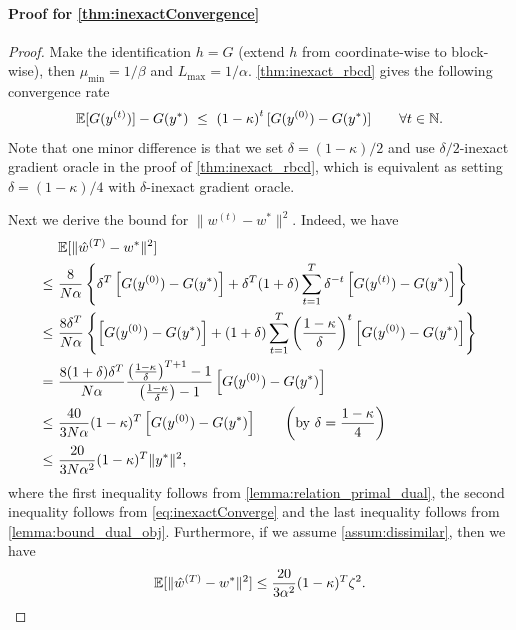 \paragraph{Proof for \autoref{thm:inexactConvergence}}
\begin{proof}
    Make the identification $h = G$ (extend $h$ from coordinate-wise to block-wise), then $\mu_{\min} = 1/\beta$ and $L_{\max} = 1/\alpha$. \autoref{thm:inexact_rbcd} gives the following convergence rate
    \begin{align}
        \mathbb{E}[ G( y^{(t)} ) ] - G( y^* ) ~\leq~ \left( 1 - \kappa \right)^t [ G( y^{(0)} ) - G( y^* ) ] \qquad \forall t \in \mathbb{N}. \label{eq:inexactConverge}
    \end{align}
    Note that one minor difference is that we set $\delta = (1-\kappa)/2$ and use $\delta/2$-inexact gradient oracle in the proof of \autoref{thm:inexact_rbcd}, which is equivalent as setting $\delta = (1-\kappa)/4$ with $\delta$-inexact gradient oracle. 
    
    Next we derive the bound for $\|w^{(t)} - w^*\|^2$. Indeed, we have
    \begin{align*}
        &\mathbb{E}[\|\hat w^{(T)} - w^*\|^2] \\
        \leq~&\frac{8}{N\alpha} \left\{ \delta^T\left[G(y^{(0)}) - G(y^*)\right] + \delta^T(1+\delta)\sum_{t=1}^T \delta^{-t}\left[G(y^{(t)}) - G(y^*)\right]\right\}
        \\\leq~& \frac{8\delta^T}{N\alpha} \left\{ \left[G(y^{(0)}) - G(y^*)\right] + (1+\delta)\sum_{t=1}^T \left(\frac{1 - \kappa}{\delta}\right)^t\left[G(y^{(0)}) - G(y^*)\right]\right\} 
        \\=~& \frac{8(1+\delta)\delta^T}{N\alpha} \frac{ \left(\frac{1 - \kappa}{\delta}\right)^{T+1} - 1}{\left(\frac{1 - \kappa}{\delta}\right) - 1} \left[G(y^{(0)}) - G(y^*)\right]
        \\\leq~& \frac{40}{3N\alpha}(1-\kappa)^T  \left[G(y^{(0)}) - G(y^*)\right] \qquad \left(\mbox{by}~ \delta = \frac{1-\kappa}{4}\right) 
        \\\leq~& \frac{20}{3N\alpha^2}(1-\kappa)^T  \|y^*\|^2,
    \end{align*}
    where the first inequality follows from \autoref{lemma:relation_primal_dual}, the second inequality follows from \eqref{eq:inexactConverge} and the last inequality follows from \autoref{lemma:bound_dual_obj}.
    Furthermore, if we assume \autoref{assum:dissimilar}, then we have 
    \[
        \mathbb{E}[\|\hat w^{(T)} - w^*\|^2] \leq \frac{20}{3\alpha^2}(1-\kappa)^T  \zeta^2.
    \]
\end{proof}

